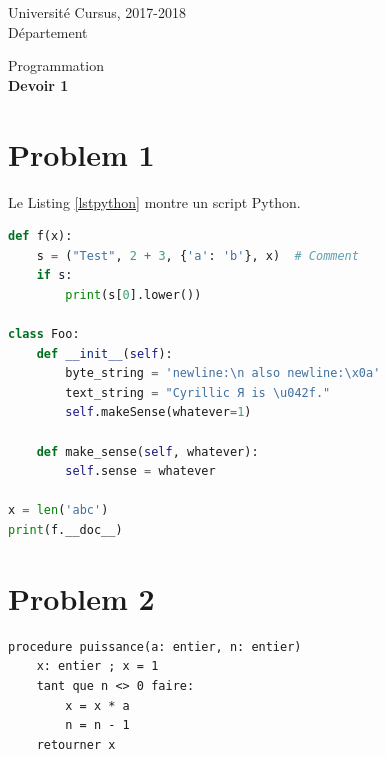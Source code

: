 

\usepackage{lipsum} %



\noindent
Université \hfill Cursus, 2017-2018 \\
Département

\begin{center}
	\Large{Programmation}\\
	\vspace{1em}
	\huge\textbf{Devoir 1}
\end{center}

\vspace{1em}

\section*{Problem 1}

Le Listing \ref{lstpython} montre un script Python.

\begin{lstlisting}[language=Python, caption=Échantillon de script Python avec coloration, label=lstpython]
def f(x):
	s = ("Test", 2 + 3, {'a': 'b'}, x)  # Comment
	if s:
		print(s[0].lower())

class Foo:
	def __init__(self):
		byte_string = 'newline:\n also newline:\x0a'
		text_string = "Cyrillic Я is \u042f."
		self.makeSense(whatever=1)
	
	def make_sense(self, whatever):
		self.sense = whatever

x = len('abc')
print(f.__doc__)
\end{lstlisting}

\lipsum[1]

\vspace{1em}

\lipsum[7]

\section*{Problem 2}

\lipsum[2]
\vspace{1em}

\begin{lstlisting}[language=Pseudo-code, caption=Calcul de puissance d'un nombre réel]
procedure puissance(a: entier, n: entier)
	x: entier ; x = 1
	tant que n <> 0 faire:
		x = x * a
		n = n - 1
	retourner x
\end{lstlisting}


